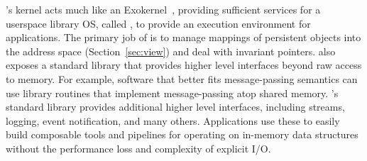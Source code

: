 \Twizzler's kernel acts much like an
Exokernel~\cite{Kaashoek,engler:sosp95}, providing sufficient services for a
userspace library OS, called \emph{\libcore}, to provide an execution environment for applications.
The primary job of \libcore is to manage mappings of persistent objects into the address space (Section~\ref{sec:view})
and deal with invariant pointers.
\Twizzler also exposes a standard library that
provides higher level interfaces beyond raw access to memory. For example, software that better fits
message-passing semantics can use library routines that implement message-passing atop shared
memory. \Twizzler's standard library provides additional
higher level interfaces, including streams, logging, event notification, and many
others. Applications use these to easily build composable tools and pipelines for
operating on in-memory data structures without the performance loss and complexity of explicit I/O\@.


























